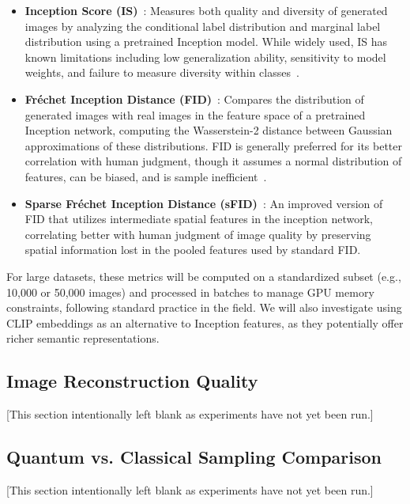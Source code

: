 \documentclass[10pt,twocolumn,letterpaper]{article}
\begin{document}
\begin{itemize}
    \item \textbf{Inception Score (IS)}~\cite{salimans2016improved}: Measures both quality and diversity of generated images by analyzing the conditional label distribution and marginal label distribution using a pretrained Inception model. While widely used, IS has known limitations including low generalization ability, sensitivity to model weights, and failure to measure diversity within classes~\cite{salimans2016improved}.
    
    \item \textbf{Fréchet Inception Distance (FID)}~\cite{heusel2017gans}: Compares the distribution of generated images with real images in the feature space of a pretrained Inception network, computing the Wasserstein-2 distance between Gaussian approximations of these distributions. FID is generally preferred for its better correlation with human judgment, though it assumes a normal distribution of features, can be biased, and is sample inefficient~\cite{heusel2017gans}.
    
    \item \textbf{Sparse Fréchet Inception Distance (sFID)}~\cite{nash2021generating}: An improved version of FID that utilizes intermediate spatial features in the inception network, correlating better with human judgment of image quality by preserving spatial information lost in the pooled features used by standard FID.
\end{itemize}

For large datasets, these metrics will be computed on a standardized subset (e.g., 10,000 or 50,000 images) and processed in batches to manage GPU memory constraints, following standard practice in the field. We will also investigate using CLIP embeddings as an alternative to Inception features, as they potentially offer richer semantic representations.

\subsection{Image Reconstruction Quality}
[This section intentionally left blank as experiments have not yet been run.]

\subsection{Quantum vs. Classical Sampling Comparison}
[This section intentionally left blank as experiments have not yet been run.]
\end{document}
